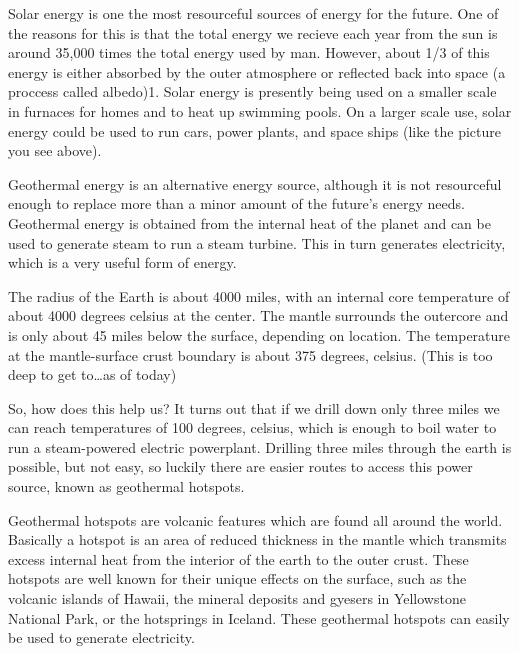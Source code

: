 \documentclass[a4paper]{article}
\begin{document}

Solar energy is one the most resourceful sources of energy for the future. One of the reasons
for this is that the total energy we recieve each year from the sun is around 35,000 times
the total energy used by man. However, about 1/3 of this energy is either absorbed by the
outer atmosphere or reflected back into space (a proccess called albedo)1.
Solar energy is presently being used on a smaller scale in furnaces for homes and to heat up
swimming pools. On a larger scale use, solar energy could be used to run cars, power plants,
and space ships (like the picture you see above).

Geothermal energy is an alternative energy source, although it is not resourceful enough to
replace more than a minor amount of the future's energy needs. Geothermal energy is obtained
from the internal heat of the planet and can be used to generate steam to run a steam turbine.
This in turn generates electricity, which is a very useful form of energy.

The radius of the Earth is about 4000 miles, with an internal core temperature of about 4000
degrees celsius at the center. The mantle surrounds the outercore and is only about 45 miles
below the surface, depending on location. The temperature at the mantle-surface crust boundary is
about 375 degrees, celsius. (This is too deep to get to\dots as of today)

So, how does this help us? It turns out that if we drill down only three miles we can reach
temperatures of 100 degrees, celsius, which is enough to boil water to run a steam-powered electric
powerplant. Drilling three miles through the earth is possible, but not easy, so luckily there are
easier routes to access this power source, known as geothermal hotspots.

Geothermal hotspots are volcanic features which are found all around the world. Basically a hotspot
is an area of reduced thickness in the mantle which transmits excess internal heat from the interior
of the earth to the outer crust. These hotspots are well known for their unique effects on the surface,
such as the volcanic islands of Hawaii, the mineral deposits and gyesers in Yellowstone National Park,
or the hotsprings in Iceland. These geothermal hotspots can easily be used to generate electricity.
\end{document}
